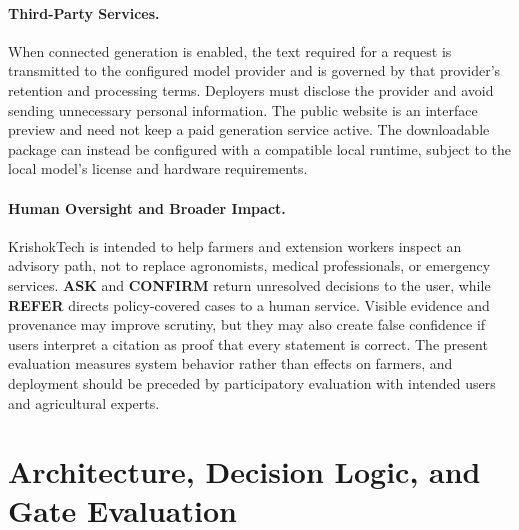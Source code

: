 \documentclass[11pt,a4paper]{article}
\begin{document}
\paragraph{Third-Party Services.}
When connected generation is enabled, the text required for a request is transmitted to the configured model provider and is governed by that provider's retention and processing terms. Deployers must disclose the provider and avoid sending unnecessary personal information. The public website is an interface preview and need not keep a paid generation service active. The downloadable package can instead be configured with a compatible local runtime, subject to the local model's license and hardware requirements.

\paragraph{Human Oversight and Broader Impact.}
KrishokTech is intended to help farmers and extension workers inspect an advisory path, not to replace agronomists, medical professionals, or emergency services. \textbf{ASK} and \textbf{CONFIRM} return unresolved decisions to the user, while \textbf{REFER} directs policy-covered cases to a human service. Visible evidence and provenance may improve scrutiny, but they may also create false confidence if users interpret a citation as proof that every statement is correct. The present evaluation measures system behavior rather than effects on farmers, and deployment should be preceded by participatory evaluation with intended users and agricultural experts.

\begingroup
\let\oldthebibliography\thebibliography
\renewcommand{\thebibliography}[1]{%
  \oldthebibliography{#1}%
  \setlength{\itemsep}{0.6pt plus 0.2pt}%
  \setlength{\parskip}{0pt}%
}

\endgroup

\clearpage
\appendix

\section{Architecture, Decision Logic, and Gate Evaluation}
\label{app:architecture}
\label{app:gate}
\end{document}
